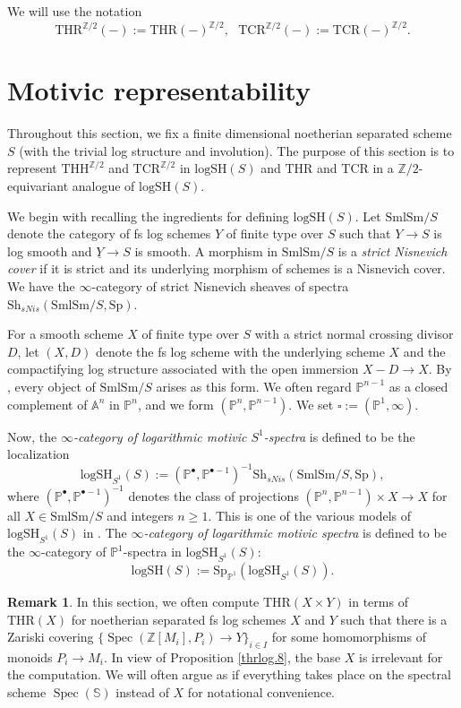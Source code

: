 \documentclass[10pt]{amsart}
\theoremstyle{definition}
\newtheorem{rmk}[thm]{Remark}
\theoremstyle{remark}
\numberwithin{equation}{section}
\newcommand{\A}{\mathbb{A}}
\renewcommand{\P}{\mathbb{P}}
\newcommand{\Sphere}{\mathbb{S}}
\newcommand{\Z}{\mathbb{Z}}
\DeclareMathOperator{\Spec}{Spec}
\newcommand{\ul}{\underline}
\newcommand{\Sh}{\mathrm{Sh}}
\newcommand{\Sp}{\mathrm{Sp}}
\newcommand{\SmlSm}{\mathrm{SmlSm}}
\newcommand{\logSH}{\mathrm{logSH}}
\newcommand{\THH}{\mathrm{THH}}
\newcommand{\THR}{\mathrm{THR}}
\newcommand{\TCR}{\mathrm{TCR}}
\newcommand{\Ztwo}{{\mathbb{Z}/2}}
\begin{document}
We will use the notation
\[
\THR^{\Z/2}(-):=\THR(-)^{\Z/2},
\text{ }
\TCR^{\Z/2}(-):=\TCR(-)^{\Z/2}.
\]


\section{Motivic representability}
\label{mot}

Throughout this section,
we fix a finite dimensional noetherian separated scheme $S$ (with the trivial log structure and involution).
The purpose of this section is to represent $\THH^{\Z/2}$ and $\TCR^{\Z/2}$ in $\logSH(S)$ and $\THR$ and $\TCR$ in a $\Ztwo$-equivariant analogue of $\logSH(S)$.

We begin with recalling the ingredients for defining $\logSH(S)$.
Let $\SmlSm/S$ denote the category of fs log schemes $Y$ of finite type over $S$ such that $Y\to S$ is log smooth and $\ul{Y}\to S$ is smooth.
A morphism in $\SmlSm/S$ is a \emph{strict Nisnevich cover} if it is strict and its underlying morphism of schemes is a Nisnevich cover.
We have the $\infty$-category of strict Nisnevich sheaves of spectra $\Sh_{sNis}(\SmlSm/S,\Sp)$.

For a smooth scheme $X$ of finite type over $S$ with a strict normal crossing divisor $D$,
let $(X,D)$ denote the fs log scheme with the underlying scheme $X$ and the compactifying log structure associated with the open immersion $X-D\to X$.
By \cite[Lemma A.5.10]{logDM},
every object of $\SmlSm/S$ arises as this form.
We often regard $\P^{n-1}$ as a closed complement of $\A^n$ in $\P^n$,
and we form $(\P^n,\P^{n-1})$.
We set $\square:=(\P^1,\infty)$.

Now, the \emph{$\infty$-category of logarithmic motivic $S^1$-spectra} is defined to be the localization
\[
\logSH_{S^1}(S)
:=
(\P^\bullet,\P^{\bullet-1})^{-1}\Sh_{sNis}(\SmlSm/S,\Sp),
\]
where $(\P^\bullet,\P^{\bullet-1})^{-1}$ denotes the class of projections $(\P^n,\P^{n-1})\times X\to X$ for all $X\in \SmlSm/S$ and integers $n\geq 1$.
This is one of the various models of $\logSH_{S^1}(S)$ in \cite[\S 3.4]{logSH}.
The \emph{$\infty$-category of logarithmic motivic spectra} is defined to be the $\infty$-category of $\P^1$-spectra in $\logSH_{S^1}(S)$:
\[
\logSH(S)
:=
\Sp_{\P^1}(\logSH_{S^1}(S)).
\]


\begin{rmk}
\label{mot.12}
In this section,
we often compute $\THR(X\times Y)$ in terms of $\THR(X)$ for noetherian separated fs log schemes $X$ and $Y$ such that there is a Zariski covering $\{\Spec(\Z[M_i],P_i)\to Y\}_{i\in I}$ for some homomorphisms of monoids $P_i\to M_i$.
In view of Proposition \ref{thrlog.8},
the base $X$ is irrelevant for the computation.
We will often argue as if everything takes place on the spectral scheme $\Spec(\Sphere)$ instead of $X$ for notational convenience.
\end{rmk}
\end{document}
